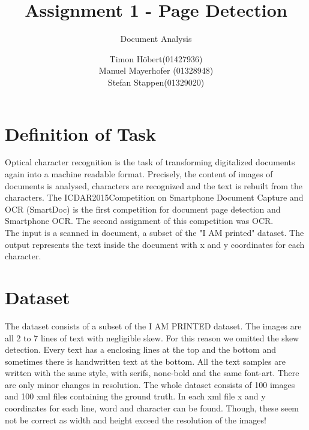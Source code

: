 \documentclass[english, paper=a4]{scrartcl}
\begin{document}
\graphicspath{{images/}}


\title{Assignment 1 - Page Detection} 

\subtitle{Document Analysis} 

\author{Timon Höbert(01427936) \\ Manuel Mayerhofer (01328948)\\ Stefan Stappen(01329020)}




\maketitle



\section{Definition of Task}
Optical character recognition is the task of transforming digitalized documents again into a machine readable format.
Precisely, the content of images of documents is analysed, characters are recognized and the text is rebuilt from the characters. The ICDAR2015Competition on Smartphone Document Capture and OCR (SmartDoc) \cite{burie2015icdar2015} is the first competition for document page detection and Smartphone OCR. The second assignment of this competition was OCR.\\
The input is a scanned in document, a subset of the "I AM printed" dataset. The output represents the text inside the document with x and y coordinates for each character.

\section{Dataset}
The dataset consists of a subset of the I AM PRINTED dataset. The images are all 2 to 7 lines of text with negligible
skew. For this reason we omitted the skew detection. Every text has a enclosing lines at the top and the bottom
and sometimes there is handwritten text at the bottom. All the text samples are written with the same style, with serifs,
none-bold and the same font-art. There are only minor changes in resolution.
The whole dataset consists of 100 images and 100 xml files containing the ground truth. In each xml file
x and y coordinates for each line, word and character can be found. Though, these seem not be correct as width and height
exceed the resolution of the images!
\end{document}
